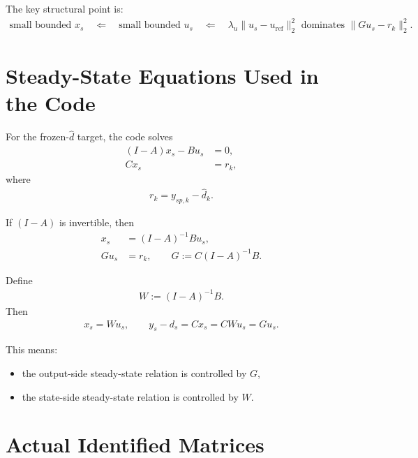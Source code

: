 \documentclass[11pt]{article}
\begin{document}
The key structural point is:
\begin{align}
\text{small bounded } x_s
\quad\Longleftarrow\quad
\text{small bounded } u_s
\quad\Longleftarrow\quad
\lambda_u \|u_s-u_{\mathrm{ref}}\|_2^2 \text{ dominates } \|Gu_s-r_k\|_2^2.
\end{align}

\section{Steady-State Equations Used in the Code}

For the frozen-$\hat d$ target, the code solves
\begin{align}
(I-A)x_s - Bu_s &= 0, \\
Cx_s &= r_k,
\end{align}
where
\begin{align}
r_k = y_{sp,k} - \hat d_k.
\end{align}

If $(I-A)$ is invertible, then
\begin{align}
x_s &= (I-A)^{-1}Bu_s, \\
Gu_s &= r_k, \qquad G := C(I-A)^{-1}B.
\end{align}

Define
\begin{align}
W := (I-A)^{-1}B.
\end{align}
Then
\begin{align}
x_s = Wu_s,
\qquad
y_s - d_s = Cx_s = CWu_s = Gu_s.
\end{align}

This means:
\begin{itemize}
\item the output-side steady-state relation is controlled by $G$,
\item the state-side steady-state relation is controlled by $W$.
\end{itemize}

\section{Actual Identified Matrices}
\end{document}
